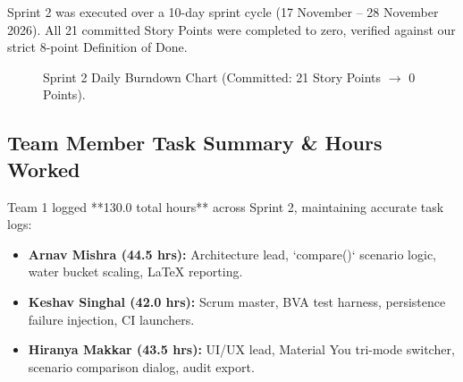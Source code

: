 \documentclass[12pt,a4paper]{article}
\begin{document}
Sprint 2 was executed over a 10-day sprint cycle (17 November – 28 November 2026). All 21 committed Story Points were completed to zero, verified against our strict 8-point Definition of Done.

\begin{figure}[htbp]
\centering
{}
\caption{Sprint 2 Daily Burndown Chart (Committed: 21 Story Points $\to$ 0 Points).}
\label{fig:burndown}
\end{figure}

\subsection{Team Member Task Summary \& Hours Worked}
Team 1 logged **130.0 total hours** across Sprint 2, maintaining accurate task logs:
\begin{itemize}[leftmargin=*,itemsep=1pt]
    \item \textbf{Arnav Mishra (44.5 hrs):} Architecture lead, `compare()` scenario logic, water bucket scaling, LaTeX reporting.
    \item \textbf{Keshav Singhal (42.0 hrs):} Scrum master, BVA test harness, persistence failure injection, CI launchers.
    \item \textbf{Hiranya Makkar (43.5 hrs):} UI/UX lead, Material You tri-mode switcher, scenario comparison dialog, audit export.
\end{itemize}
\end{document}
